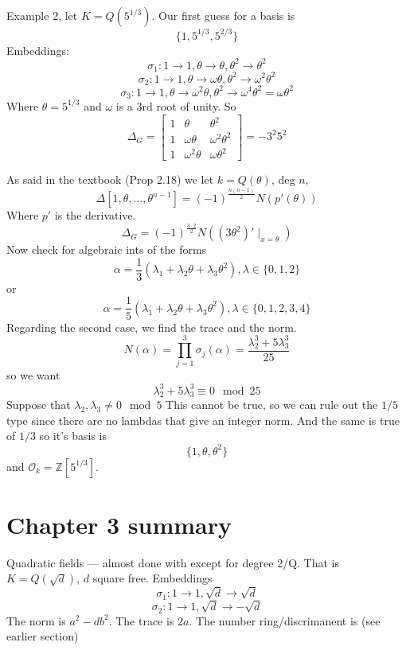 \documentclass{article}
\begin{document}
Example 2, let $K = Q(5^{1/3})$. Our first guess for a basis is 
\[ \{1, 5^{1/3}, 5^{2/3} \} \]
Embeddings: 
\[ \sigma_1: 1 \rightarrow 1, \theta \rightarrow \theta, \theta^2 \rightarrow
\theta^2 \]
\[ \sigma_2 : 1\rightarrow 1, \theta \rightarrow \omega\theta, \theta^2
\rightarrow \omega^2 \theta^2 \]
\[ \sigma_3 : 1 \rightarrow 1, \theta \rightarrow \omega^2 \theta, \theta^2
\rightarrow \omega^4 \theta^2 = \omega \theta^2 \]
Where $\theta = 5^{1/3}$ and $\omega$ is a 3rd root of unity.
So
\[ \Delta_G = \begin{bmatrix} 1 & \theta & \theta^2 \\
1 & \omega \theta & \omega^2 \theta^2 \\
1 & \omega^2 \theta & \omega \theta^2 \end{bmatrix} = -3^2 5^2 \]

As said in the textbook (Prop 2.18) we let $k = Q(\theta)$, deg $n$,
\[ \Delta[1,\theta,\ldots,\theta^{n-1}] = (-1)^{\frac{n(n-1)}{2}} N(p'(\theta)) \]
Where $p'$ is the derivative.
\[ \Delta_G = (-1)^{\frac{3\cdot 2}{2}} N((3\theta^2)'\mid_{x=\theta}) \]
Now check for algebraic ints of the forms
\[ \alpha = \frac{1}{3} (\lambda_1 + \lambda_2 \theta + \lambda_3 \theta^2),
\lambda \in \{0,1,2\} \]
or
\[ \alpha = \frac{1}{5} (\lambda_1 + \lambda_2 \theta + \lambda_3 \theta^2),
\lambda \in \{0,1,2,3,4\} \]
Regarding the second case, we find the trace and the norm. 
\[ N(\alpha) = \prod_{j = 1}^3 \sigma_j(\alpha) =
\frac{\lambda_2^3+5\lambda_3^3}{25} \]
so we want
\[ \lambda_2^3 + 5 \lambda_3^3 \equiv 0 \mod 25 \]
Suppose that $\lambda_2,\lambda_3 \neq 0 \mod 5$
This cannot be true, so we can rule out the $1/5$ type since there are no
lambdas that give an integer norm. And the same is true of $1/3$ so it's basis
is \[ \{1,\theta,\theta^2\} \]
and $\mathcal{O}_k = \mathbb{Z}[5^{1/3}]$. 

\section*{Chapter 3 summary}
Quadratic fields --- almost done with except for degree 2/Q. That is $K =
Q(\sqrt{d})$, $d$ square free. Embeddings 
\[ \sigma_1 : 1 \rightarrow 1, \sqrt{d} \rightarrow \sqrt{d} \]
\[ \sigma_2 : 1 \rightarrow 1, \sqrt{d} \rightarrow - \sqrt{d} \]
The norm is $a^2 - d b^2$. The trace is $2a$. The number ring/discrimanent is
(see earlier section)
\end{document}
